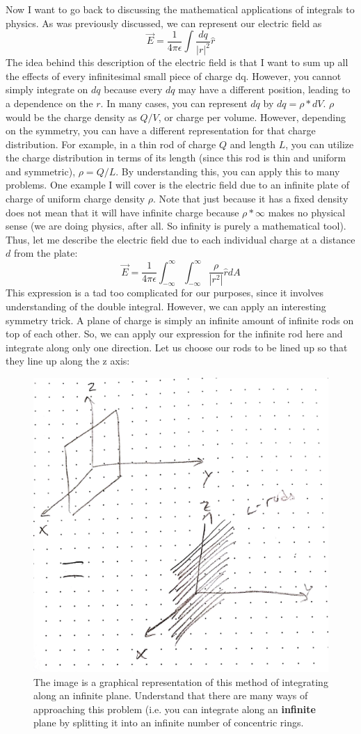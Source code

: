 \documentclass{article}
\begin{document}
Now I want to go back to discussing the mathematical applications of integrals to physics. As was previously discussed, we can represent our electric field as $$\vec{E} = \frac{1}{4\pi\epsilon}\int \frac{dq}{|r|^2}\hat{r}$$The idea behind this description of the electric field is that I want to sum up all the effects of every infinitesimal small piece of charge dq. However, you cannot simply integrate on $dq$ because every $dq$ may have a different position, leading to a dependence on the $r$. In many cases, you can represent $dq$ by $dq = \rho *dV$. $\rho$ would be the charge density as $Q/V$, or charge per volume. However, depending on the symmetry, you can have a different representation for that charge distribution. For example, in a thin rod of charge $Q$ and length $L$, you can utilize the charge distribution in terms of its length (since this rod is thin and uniform and symmetric), $\rho = Q/L$. By understanding this, you can apply this to many problems. One example I will cover is the electric field due to an infinite plate of charge of uniform charge density $\rho$. Note that just because it has a fixed density does not mean that it will have infinite charge because $\rho * \infty$ makes no physical sense (we are doing physics, after all. So infinity is purely a mathematical tool). Thus, let me describe the electric field due to each individual charge at a distance $d$ from the plate: $$\vec{E} = \frac{1}{4\pi\epsilon}\int_{-\infty}^{\infty}\int_{-\infty}^{\infty}\frac{\rho}{|r^2|}\hat{r}dA$$This expression is a tad too complicated for our purposes, since it involves understanding of the double integral. However, we can apply an interesting symmetry trick. A plane of charge is simply an infinite amount of infinite rods on top of each other. So, we can apply our expression for the infinite rod here and integrate along only one direction. Let us choose our rods to be lined up so that they line up along the z axis:
\pagebreak
\begin{figure}[ht]
\center
\includegraphics[width=.3\textwidth]{images/Week1pic3.jpg}
\caption{The image is a graphical representation of this method of integrating along an infinite plane. Understand that there are many ways of approaching this problem (i.e. you can integrate along an \textbf{infinite} plane by splitting it into an infinite number of concentric rings.}
\end{figure}\\
\end{document}
